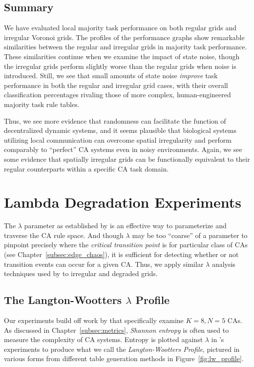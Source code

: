 \documentclass[a4paper,11pt,twoside]{report}
\begin{document}
\section{Summary}


We have evaluated local majority task performance on both regular grids and irregular Voronoi grids. The profiles of the performance graphs show remarkable similarities between the regular and irregular grids in majority task performance. These similarities continue when we examine the impact of state noise, though the irregular grids perform slightly worse than the regular grids when noise is introduced. Still, we see that small amounts of state noise \textit{improve} task performance in both the regular and irregular grid cases, with their overall classification percentages rivaling those of more complex, human-engineered majority task rule tables.

Thus, we see more evidence that randomness can facilitate the function of decentralized dynamic systems, and it seems plausible that biological systems utilizing local communication can overcome spatial irregularity and perform comparably to ``perfect'' CA systems even in noisy environments. Again, we see some evidence that spatially irregular grids can be functionally equivalent to their regular counterparts within a specific CA task domain.

\processdelayedfloats


\chapter{Lambda Degradation Experiments}
\label{ch:lambda_degen}
The $\lambda$ parameter as established by \citeauthor{la90} is an effective way to parameterize and traverse the CA rule space. And though $\lambda$ may be too ``coarse'' of a parameter to pinpoint precisely where the \textit{critical transition point} is for particular class of CAs (see Chapter~\ref{subsec:edge_chaos}), it is sufficient for detecting whether or not transition events can occur for a given CA. Thus, we apply similar $\lambda$ analysis techniques used by \citeauthor{wo90} to irregular and degraded grids.

\section{The Langton-Wootters $\lambda$ Profile}
Our experiments build off work by \citeauthor{wo90} that specifically examine $K=8, N=5$ CAs. As discussed in Chapter~\ref{subsec:metrics}, \textit{Shannon entropy} is often used to measure the complexity of CA systems. Entropy is plotted against $\lambda$ in \citeauthor{wo90}'s experiments to produce what we call the \textit{Langton-Wootters Profile}, pictured in various forms from different table generation methods in Figure~\ref{fig:lw_profile}.
\end{document}
